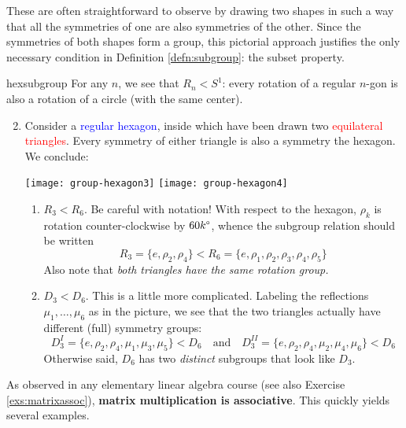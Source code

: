 \pagebreak



These are often straightforward to observe by drawing two shapes in such a way that all the symmetries of one are also symmetries of the other. Since the symmetries of both shapes form a group, this pictorial approach justifies the only necessary condition in Definition \ref{defn:subgroup}: the subset property.

\begin{examples}{}{hexsubgroup}
	\exstart For any $n$, we see that $R_n< S^1$: every rotation of a regular $n$-gon is also a rotation of a circle (with the same center).
	\begin{enumerate}\setcounter{enumi}{1}
	  \item\label{ex:hexsubgroup2} Consider a \textcolor{blue}{regular hexagon}, inside which have been drawn two \textcolor{red}{equilateral triangles}. Every symmetry of either triangle is also a symmetry the hexagon. We conclude:
	 	\begin{center}
			\texttt{[image: group-hexagon3]}
			\qquad\qquad
			\texttt{[image: group-hexagon4]}
		\end{center}
	  \begin{enumerate}
	    \item $R_3< R_6$. Be careful with notation! With respect to the hexagon, $\rho_k$ is rotation counter-clockwise by $\ang{60k}$, whence the subgroup relation should be written 
	    \[
	    	R_3=\{e,\rho_2,\rho_4\} < R_6=\{e,\rho_1,\rho_2,\rho_3,\rho_4,\rho_5\}
	    \]
	    Also note that \emph{both triangles have the same rotation group.}
	    
	  	\item $D_3< D_6$. This is a little more complicated. Labeling the reflections $\mu_1,\ldots,\mu_6$ as in the picture, we see that the two triangles actually have different (full) symmetry groups:
			\[
				D_3^I=\{e,\rho_2,\rho_4,\mu_1,\mu_3,\mu_5\} < D_6
				\quad\text{and}\quad
				D_3^{II}=\{e,\rho_2,\rho_4,\mu_2,\mu_4,\mu_6\} < D_6
			\]
			Otherwise said, $D_6$ has two \emph{distinct} subgroups that look like $D_3$.
		\end{enumerate}
	\end{enumerate}
\end{examples}



As observed in any elementary linear algebra course (see also Exercise \ref{exs:matrixassoc}), \textbf{matrix multiplication is associative}. This quickly yields several examples.

